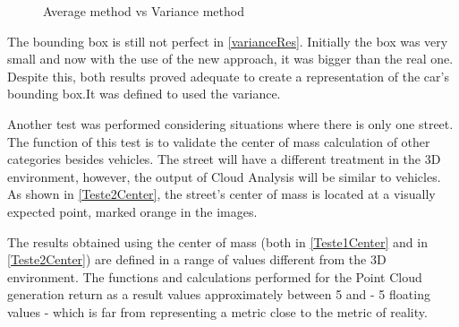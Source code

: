     \begin{figure}[H]
      \centering
        \caption{
        Average method vs Variance method}
        \qquad
        \qquad
      \label{testeColoredCloud}
    \end{figure} 
    
    The bounding box is still not perfect in \autoref{varianceRes}. Initially the box was very small and now with the use of the new approach, it was bigger than the real one. Despite this, both results proved adequate to create a representation of the car's bounding box.It was defined to used the variance.
    
    Another test was performed considering situations where there is only one street. The function of this test is to validate the center of mass calculation of other categories besides vehicles. The street will have a different treatment in the 3D environment, however, the output of Cloud Analysis will be similar to vehicles. As shown in \autoref{Teste2Center}, the street's center of mass is located at a visually expected point, marked orange in the images.
    
    The results obtained using the center of mass (both in \autoref{Teste1Center} and in \autoref{Teste2Center}) are defined in a range of values different from the 3D environment. The functions and calculations performed for the Point Cloud generation return as a result values approximately between 5 and - 5 floating values - which is far from representing a metric close to the metric of reality.
    
